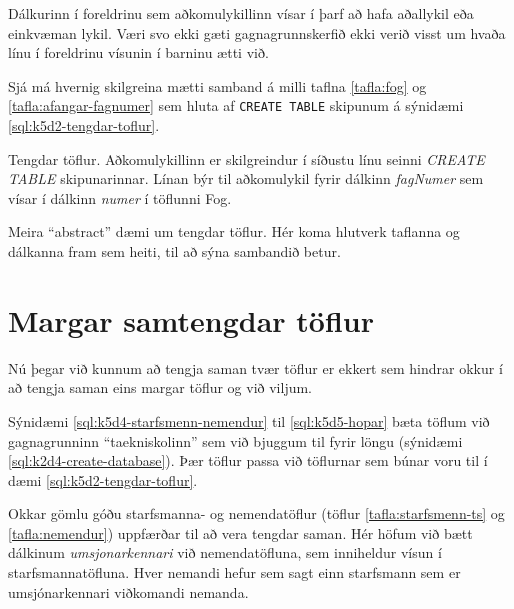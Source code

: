 Dálkurinn í foreldrinu sem aðkomulykillinn vísar í þarf að hafa aðallykil eða einkvæman lykil. Væri svo ekki gæti gagnagrunnskerfið ekki verið visst um hvaða línu í foreldrinu vísunin í barninu ætti við.

Sjá má hvernig skilgreina mætti samband á milli taflna \ref{tafla:fog} og \ref{tafla:afangar-fagnumer} sem hluta af \verb|CREATE TABLE| skipunum á sýnidæmi \ref{sql:k5d2-tengdar-toflur}.

\begin{example}
\caption[FOREIGN KEY - tengdar töflur]{Tengdar töflur. Aðkomulykillinn er skilgreindur í síðustu línu seinni \emph{CREATE TABLE} skipunarinnar. Línan býr til aðkomulykil fyrir dálkinn \emph{fagNumer} sem vísar í dálkinn \emph{numer} í töflunni Fog.}
\label{sql:k5d2-tengdar-toflur}
\centering
{}
\end{example}

\begin{example}
\caption[FOREIGN KEY - abstract dæmi]{Meira ``abstract'' dæmi um tengdar töflur. Hér koma hlutverk taflanna og dálkanna fram sem heiti, til að sýna sambandið betur.}
\label{sql:k5d3-abstract-toflur}
\centering
{}
\end{example}

\section{Margar samtengdar töflur}
Nú þegar við kunnum að tengja saman tvær töflur er ekkert sem hindrar okkur í að tengja saman eins margar töflur og við viljum.

Sýnidæmi \ref{sql:k5d4-starfsmenn-nemendur} til \ref{sql:k5d5-hopar} bæta töflum við gagnagrunninn ``taekniskolinn'' sem við bjuggum til fyrir löngu (sýnidæmi \ref{sql:k2d4-create-database}). Þær töflur passa við töflurnar sem búnar voru til í dæmi \ref{sql:k5d2-tengdar-toflur}.

\begin{example}
\caption[Starfsmenn og nemendur]{Okkar gömlu góðu starfsmanna- og nemendatöflur (töflur \ref{tafla:starfsmenn-ts} og \ref{tafla:nemendur}) uppfærðar til að vera tengdar saman. Hér höfum við bætt dálkinum \emph{umsjonarkennari} við nemendatöfluna, sem inniheldur vísun í starfsmannatöfluna. Hver nemandi hefur sem sagt einn starfsmann sem er umsjónarkennari viðkomandi nemanda.}
\label{sql:k5d4-starfsmenn-nemendur}
\centering
{}
\end{example}

